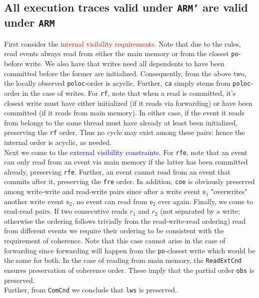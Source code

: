 \documentclass{article}
\newcommand{\var}{\texttt}
\begin{document}
\subsection{All execution traces valid under \var{ARM'} are valid under \var{ARM}}
First consider the \textcolor{red}{internal visibility requirements}. Note that due to the rules, read events always read from either the main memory or from the closest \var{po}-before write. We also have that writes need all dependents to have been committed before the former are initialized. Consequently, from the above two, the locally observed \var{poloc}-order is acyclic. Further, \var{ca} simply stems from \var{poloc}-order in the case of writes. For \var{rf}, note that when a read is committed, it's closest write must have either initialized (if it reads via forwarding) or have been committed (if it reads from main memory). In either case, if the event it reads from belongs to the same thread must have already at least been initialized, preserving the \var{rf} order. Thus no cycle may exist among these pairs: hence the internal order is acyclic, as needed.\\
Next we come to the \textcolor{blue}{external visibility constraints}. For \var{rfe}, note that an event can only read from an event via main memory if the latter has been committed already, preserving \var{rfe}. Further, an event cannot read from an event that commits after it, preserving the \var{fre} order. In addition, \var{coe} is obviously preserved among write-write and read-write pairs since after a write event $\mathbb{e}_1$ "overwrites" another write event $\mathbb{e}_2$, no event can read from $\mathbb{e}_2$ ever again. Finally, we come to read-read pairs. If two consecutive reads $r_1$ and $r_2$ (not separated by a write; otherwise the ordering follows trivially from the read-write-read ordering) read from different events we require their ordering to be consistent with the requirement of coherence. Note that this case cannot arise in the case of forwarding since forwarding will happen from the \var{po}-closest write which would be the same for both. In the case of reading from main memory, the \var{ReadExtCnd} ensures preservation of coherence order. These imply that the partial order \var{obs} is preserved.\\
Further, from \var{ComCnd} we conclude that \var{lws} is preserved.\\
\end{document}

